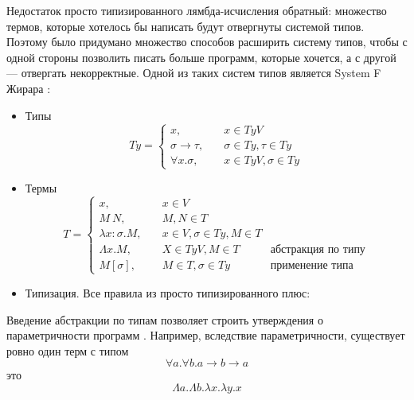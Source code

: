 Недостаток просто типизированного лямбда-исчисления обратный: множество термов,
которые хотелось бы написать будут отвергнуты системой типов. Поэтому было придумано
множество способов расширить систему типов, чтобы с одной стороны позволить писать
больше программ, которые хочется, а с другой --- отвергать некорректные. Одной из
таких систем типов является System F Жирара \cite{tapl}:
\begin{itemize}
\item Типы
   \[
   Ty = \left\{
   \begin{array}{lr}
   x,\quad& x \in TyV\\
   \sigma \rightarrow \tau,\quad& \sigma \in Ty, \tau \in Ty\\
   \forall x. \sigma,\quad& x \in TyV, \sigma \in Ty
   \end{array}
   \right.
   \]
\item Термы
   \[
   T = \left\{
   \begin{array}{lrr}
   x,\quad& x \in V&\\
   M\ N,\quad& M, N \in T&\\
   \lambda x : \sigma. M,\quad& x \in V, \sigma \in Ty, M \in T&\\
   \Lambda x. M,\quad& X \in TyV, M \in T\quad&\text{абстракция по типу}\\
   M [\sigma],\quad& M \in T, \sigma \in Ty\quad&\text{применение типа}
   \end{array}
   \right.
   \]
\item Типизация. Все правила из просто типизированного плюс:
   \begin{prooftree}
   \end{prooftree}
   \begin{prooftree}
   \end{prooftree}
\end{itemize}

Введение абстракции по типам позволяет строить утверждения о параметричности
программ \cite{theorems-for-free}.
Например, вследствие параметричности, существует ровно один терм с типом
\[\forall a. \forall b. a \rightarrow b \rightarrow a\] это
\[\Lambda a. \Lambda b. \lambda x. \lambda y. x\]
